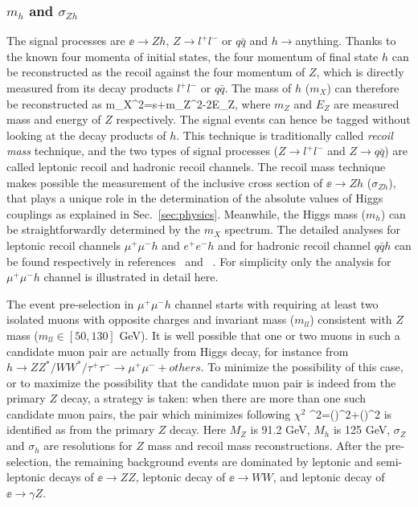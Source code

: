 
\subsubsection{$m_h$ and $\sigma_{Zh}$}
\label{sec:higgs:sigmazh}
The signal processes are $\ee\to Zh$, $Z\to l^+l^-$ or $q\bar{q}$ and 
$h\to$anything. Thanks to the known four momenta of initial states, 
the four momentum of final state $h$ can be reconstructed 
as the recoil against the four momentum of $Z$, which is directly
measured from its decay products $l^+l^-$ or $q\bar{q}$. 
The mass of $h$ ($m_X$) can therefore be reconstructed as
\beq
m_X^2=s+m_Z^2-2E_Z,
where $m_Z$ and $E_Z$ are measured mass and energy of $Z$
respectively. The signal events can hence be tagged without looking
at the decay products of $h$. This technique is traditionally called
{\it recoil mass} technique, and the two types of signal processes 
($Z\to l^+l^-$ and $Z\to q\bar{q}$) are called
leptonic recoil and hadronic recoil channels. The recoil mass technique
makes possible the measurement of the inclusive cross section of $\ee\to Zh$ ($\sigma_{Zh}$),
that plays a unique role in the determination of the absolute values of
Higgs couplings as explained in Sec.~\ref{sec:physics}.
Meanwhile, the Higgs mass ($m_h$) can be straightforwardly determined by 
the $m_X$ spectrum. The detailed analyses for leptonic recoil channels
$\mu^+\mu^-h$ and $e^+e^-h$ and for hadronic recoil channel $q\bar{q}h$
can be found respectively in references~\cite{Yan:2016xyx} and 
~\cite{Tomita:2015,Thomson:2015jda,Miyamoto:2013zva}. 
For simplicity only the analysis for $\mu^+\mu^-h$ channel is illustrated in detail here.

The event pre-selection in $\mu^+\mu^-h$ channel starts with requiring at least 
two isolated muons with opposite charges and invariant mass ($m_{ll}$) consistent 
with $Z$ mass ($m_{ll}\in[50,130]$ GeV). 
It is well possible that one or two muons in such a candidate 
muon pair are actually from Higgs decay, for instance from 
$h\to ZZ^*/WW^*/\tau^+\tau^-\to \mu^+\mu^-+others$. To minimize the possibility of
this case, or to maximize the possibility that the candidate muon pair is 
indeed from the primary $Z$ decay, a strategy is taken:
when there are more than one such candidate muon pairs,
the pair which minimizes following $\chi^2$ 
\beq
\chi^2=()^2+()^2
is identified as from the primary $Z$ decay. Here $M_Z$ is 91.2 GeV,
$M_h$ is 125 GeV, $\sigma_Z$ and $\sigma_h$ are resolutions for 
$Z$ mass and recoil mass reconstructions. 
After the pre-selection, the remaining background events are dominated by
leptonic and semi-leptonic decays of $\ee\to ZZ$, leptonic decay of $\ee\to WW$, 
and leptonic decay of $\ee\to \gamma Z$. 

